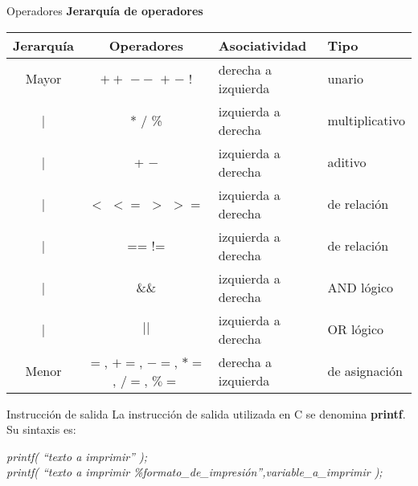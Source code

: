 \begin{frame}[t]{Operadores}
\textbf{Jerarquía de operadores}\\ \vspace{5mm}
\scriptsize
\centering
\begin{tabular}{ccll}
	\toprule
	\textbf{Jerarqu\'ia} & \textbf{Operadores} & \textbf{Asociatividad} & \textbf{Tipo}\\ 
	\midrule 
	Mayor & $++$ $--$ $+$ $-$ $!$ & derecha a izquierda & unario\\ \cline{2-4}
	| & * / \% & izquierda a derecha & multiplicativo\\ \cline{2-4}
	| & + $-$ & izquierda a derecha & aditivo\\ \cline{2-4}
	| & $<$ $<=$ $>$ $>=$ & izquierda a derecha & de relaci\'on \\ \cline{2-4}
	| & == != & izquierda a derecha & de relación\\ \cline{2-4}
	| & \&\& & izquierda a derecha & AND lógico\\ \cline{2-4}
	| & $| |$ & izquierda a derecha & OR lógico \\ \cline{2-4}
	Menor & $=$, $+=$, $-=$, $*=$, $/=$, $\%=$ & derecha a izquierda & de asignación \\ 
	\bottomrule
\end{tabular}
\end{frame}


\begin{frame}{Instrucción de salida}
La instrucción de salida utilizada en C se denomina \textbf{printf}. Su sintaxis es:\\
\vspace{5mm}

{\small \textit{printf( ``texto a imprimir'' );}\\
\textit{printf( ``texto a imprimir \%formato\_de\_impresión'',variable\_a\_imprimir );}}
\end{frame}


